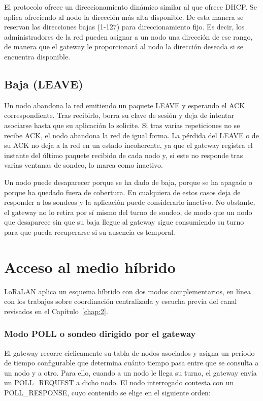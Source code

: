 El protocolo ofrece un direccionamiento dinámico similar al que ofrece DHCP. Se aplica ofreciendo al nodo la dirección más alta disponible. De esta manera se reservan las direcciones bajas (1-127) para direccionamiento fijo. Es decir, los administradores de la red pueden asignar a un nodo una dirección de ese rango, de manera que el gateway le proporcionará al nodo la dirección deseada si se encuentra disponible.


\subsection{Baja (LEAVE)}

Un nodo abandona la red emitiendo un paquete LEAVE y esperando el ACK correspondiente. Tras recibirlo, borra su clave de sesión y deja de intentar asociarse hasta que su aplicación lo solicite. Si tras varias repeticiones no se recibe ACK, el nodo abandona la red de igual forma. La pérdida del LEAVE o de su ACK no deja a la red en un estado incoherente, ya que el gateway registra el instante del último paquete recibido de cada nodo y, si este no responde tras varias ventanas de sondeo, lo marca como inactivo.

Un nodo puede desaparecer porque se ha dado de baja, porque se ha apagado o porque ha quedado fuera de cobertura. En cualquiera de estos casos deja de responder a los sondeos y la aplicación puede considerarlo inactivo. No obstante, el gateway no lo retira por sí mismo del turno de sondeo, de modo que un nodo que desaparece sin que su baja llegue al gateway sigue consumiendo su turno para que pueda recuperarse si su ausencia es temporal.

\section{Acceso al medio híbrido}\label{sec:mac}

LoRaLAN aplica un esquema híbrido con dos modos complementarios, en línea con los trabajos sobre coordinación centralizada y escucha previa del canal revisados en el Capítulo~\ref{chap:2}.

\subsubsection{Modo POLL o sondeo dirigido por el gateway}\label{sec:poll}

El gateway recorre cíclicamente su tabla de nodos asociados y asigna un periodo de tiempo configurable que determina cuánto tiempo pasa entre que se consulta a un nodo y a otro. Para ello, cuando a un nodo le llega su turno, el gateway envía un POLL\_REQUEST a dicho nodo. El nodo interrogado contesta con un POLL\_RESPONSE, cuyo contenido se elige en el siguiente orden:

